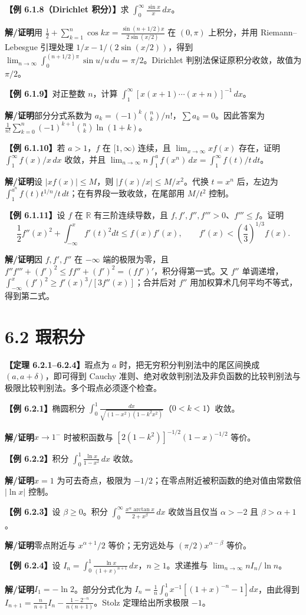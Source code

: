 \documentclass[UTF8,a4paper,11pt]{ctexart}
\newcommand{\ex}[1]{\par\noindent\textbf{【例 #1】}\;}
\newcommand{\thm}[1]{\par\noindent\textbf{【定理 #1】}\;}
\newcommand{\sol}{\par\noindent\textbf{解/证明}\;}
\newcommand{\R}{\mathbb R}
\begin{document}
\ex{6.1.8（Dirichlet 积分）}求 $\int_0^\infty\frac{\sin x}{x}\,dx$。
\sol 用 $\frac12+\sum_{k=1}^n\cos kx=\frac{\sin(n+1/2)x}{2\sin(x/2)}$ 在 $(0,\pi)$ 上积分，并用 Riemann--Lebesgue 引理处理 $1/x-1/(2\sin(x/2))$，得到 $\lim_{n\to\infty}\int_0^{(n+1/2)\pi}\sin u/u\,du=\pi/2$。Dirichlet 判别法保证原积分收敛，故值为 $\pi/2$。
\ex{6.1.9}对正整数 $n$，计算 $\int_1^\infty [x(x+1)\cdots(x+n)]^{-1}\,dx$。
\sol 部分分式系数为 $a_k=(-1)^k\binom nk/n!$，$\sum a_k=0$。因此答案为 $\displaystyle\frac1{n!}\sum_{k=0}^n(-1)^{k+1}\binom nk\ln(1+k)$。
\ex{6.1.10}若 $a>1$，$f$ 在 $[1,\infty)$ 连续，且 $\lim_{x\to\infty}xf(x)$ 存在，证明 $\int_1^\infty f(x)/x\,dx$ 收敛，并且 $\lim_{n\to\infty}n\int_1^a f(x^n)\,dx=\int_1^\infty f(t)/t\,dt$。
\sol 设 $|xf(x)|\le M$，则 $|f(x)/x|\le M/x^2$。代换 $t=x^n$ 后，左边为 $\int_1^{a^n}f(t)t^{1/n}/t\,dt$；在有界段一致收敛，在尾部用 $M/t^2$ 控制。
\ex{6.1.11}设 $f$ 在 $\R$ 有三阶连续导数，且 $f,f',f'',f'''>0$、$f'''\le f$。证明
\[\frac12f''(x)^2+\int_{-\infty}^x f'(t)^2dt\le f(x)f'(x),\qquad f'(x)<\left(\frac43\right)^{1/3}f(x).\]
\sol 因 $f,f',f''$ 在 $-\infty$ 端的极限为零，且 $f''f'''+(f')^2\le ff''+(f')^2=(ff')'$，积分得第一式。又 $f''$ 单调递增，$\int_{-\infty}^x(f')^2\ge f'(x)^3/[3f''(x)]$；合并后对 $f''$ 用加权算术几何平均不等式，得到第二式。
\section*{6.2 瑕积分}
\thm{6.2.1--6.2.4}瑕点为 $a$ 时，把无穷积分判别法中的尾区间换成 $(a,a+\delta)$，即可得到 Cauchy 准则、绝对收敛判别法及非负函数的比较判别法与极限比较判别法。多个瑕点必须逐个检查。
\ex{6.2.1}椭圆积分 $\displaystyle\int_0^1\frac{dx}{\sqrt{(1-x^2)(1-k^2x^2)}}$（$0<k<1$）收敛。
\sol $x\to1^-$ 时被积函数与 $[2(1-k^2)]^{-1/2}(1-x)^{-1/2}$ 等价。
\ex{6.2.2}积分 $\int_0^1\frac{\ln x}{1-x^2}\,dx$ 收敛。
\sol $x=1$ 为可去奇点，极限为 $-1/2$；在零点附近被积函数的绝对值由常数倍 $|\ln x|$ 控制。
\ex{6.2.3}设 $\beta\ge0$。积分 $\displaystyle\int_0^\infty\frac{x^\alpha\arctan x}{2+x^\beta}\,dx$ 收敛当且仅当 $\alpha>-2$ 且 $\beta>\alpha+1$。
\sol 零点附近与 $x^{\alpha+1}/2$ 等价；无穷远处与 $(\pi/2)x^{\alpha-\beta}$ 等价。
\ex{6.2.4}设 $I_n=\int_0^1\frac{\ln x}{(1+x)^{n+1}}\,dx$，$n\ge1$。求递推与 $\lim_{n\to\infty}nI_n/\ln n$。
\sol $I_1=-\ln2$。部分分式化为 $I_n=\frac1n\int_0^1x^{-1}[(1+x)^{-n}-1]dx$，由此得到 $I_{n+1}=\frac n{n+1}I_n-\frac{1-2^{-n}}{n(n+1)}$。Stolz 定理给出所求极限 $-1$。
\end{document}
